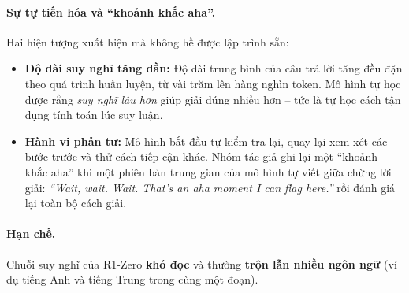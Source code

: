 \paragraph{Sự tự tiến hóa và “khoảnh khắc aha”.} Hai hiện tượng xuất hiện mà không hề được lập trình sẵn:
\begin{itemize}
	\item \textbf{Độ dài suy nghĩ tăng dần:} Độ dài trung bình của câu trả lời tăng đều đặn theo quá trình huấn luyện, từ vài trăm lên hàng nghìn token. Mô hình tự học được rằng \emph{suy nghĩ lâu hơn} giúp giải đúng nhiều hơn -- tức là tự học cách tận dụng tính toán lúc suy luận.
	\item \textbf{Hành vi phản tư:} Mô hình bắt đầu tự kiểm tra lại, quay lại xem xét các bước trước và thử cách tiếp cận khác. Nhóm tác giả ghi lại một “khoảnh khắc aha” khi một phiên bản trung gian của mô hình tự viết giữa chừng lời giải: \emph{“Wait, wait. Wait. That's an aha moment I can flag here.”} rồi đánh giá lại toàn bộ cách giải.
\end{itemize}

\begin{center}
\label{fig:r1_zero_length}
\end{center}

\paragraph{Hạn chế.} Chuỗi suy nghĩ của R1-Zero \textbf{khó đọc} và thường \textbf{trộn lẫn nhiều ngôn ngữ} (ví dụ tiếng Anh và tiếng Trung trong cùng một đoạn).

